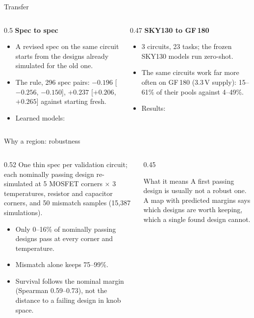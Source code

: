 \begin{frame}{Transfer}
  \begin{columns}[T]
    \begin{column}{0.5\textwidth}
      \textbf{Spec to spec}
      \small
      \begin{itemize}
        \item A revised spec on the same circuit starts from the designs already simulated for the old one.
        \item The rule, 296 spec pairs: \prederr{} $-0.196$ [$-0.256$, $-0.150$], \passfail{} $+0.237$ [$+0.206$,
          $+0.265$] against starting fresh.
        \item Learned models: 
      \end{itemize}
    \end{column}
    \begin{column}{0.47\textwidth}
      \textbf{SKY130 to GF\,180}
      \small
      \begin{itemize}
        \item 3 circuits, 23 tasks; the frozen SKY130 models run zero-shot.
        \item The same circuits work far more often on GF\,180 (3.3\,V supply): 15--61\% of their pools against
          4--49\%.
        \item Results: 
      \end{itemize}
    \end{column}
  \end{columns}
\end{frame}

\begin{frame}{Why a region: robustness}
  \begin{columns}[c]
    \begin{column}{0.52\textwidth}
      \small
      One thin spec per validation circuit; each nominally passing design re-simulated at 5 MOSFET corners
      $\times$ 3 temperatures, resistor and capacitor corners, and 50 mismatch samples (15,387 simulations).
      \begin{itemize}
        \item Only \alert{0--16\%} of nominally passing designs pass at every corner and temperature.
        \item Mismatch alone keeps 75--99\%.
        \item Survival follows the \alert{nominal margin} (Spearman 0.59--0.73), not the distance to a failing design
          in knob space.
      \end{itemize}
    \end{column}
    \begin{column}{0.45\textwidth}
      \begin{block}{What it means}
        \small
        A first passing design is usually not a robust one. A map with predicted margins says which designs are
        worth keeping, which a single found design cannot.
      \end{block}
    \end{column}
  \end{columns}
\end{frame}

